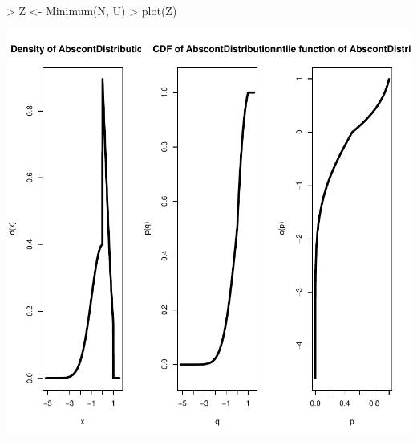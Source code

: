 \documentclass[11pt]{article}
\begin{document}
\begin{Schunk}
\begin{Sinput}
> Z <- Minimum(N, U)
> plot(Z)
\end{Sinput}
\end{Schunk}
\includegraphics{distr-min}
\end{document}
